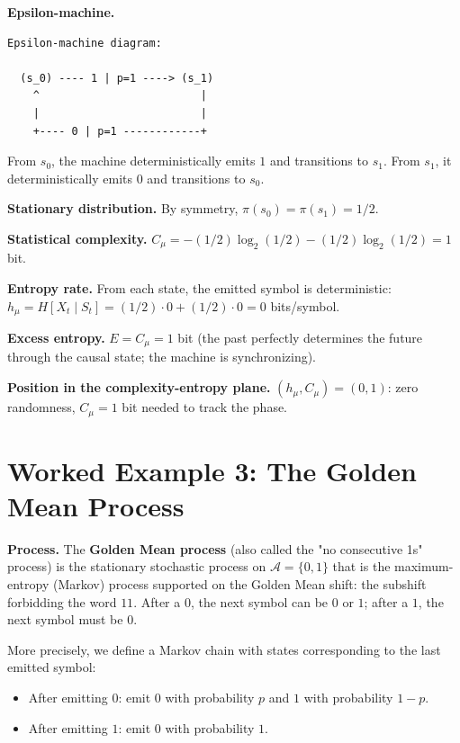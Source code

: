\textbf{Epsilon-machine.}

\begin{verbatim}
Epsilon-machine diagram:

  (s_0) ---- 1 | p=1 ----> (s_1)
    ^                         |
    |                         |
    +---- 0 | p=1 ------------+
\end{verbatim}

From $s_0$, the machine deterministically emits $1$ and transitions to $s_1$. From $s_1$, it deterministically emits $0$ and transitions to $s_0$.

\textbf{Stationary distribution.} By symmetry, $\pi(s_0) = \pi(s_1) = 1/2$.

\textbf{Statistical complexity.} $C_\mu = -(1/2)\log_2(1/2) - (1/2)\log_2(1/2) = 1$ bit.

\textbf{Entropy rate.} From each state, the emitted symbol is deterministic: $h_\mu = H[X_t \mid S_t] = (1/2)\cdot 0 + (1/2) \cdot 0 = 0$ bits/symbol.

\textbf{Excess entropy.} $E = C_\mu = 1$ bit (the past perfectly determines the future through the causal state; the machine is synchronizing).

\textbf{Position in the complexity-entropy plane.} $(h_\mu, C_\mu) = (0, 1)$: zero randomness, $C_\mu = 1$ bit needed to track the phase.



\section{Worked Example 3: The Golden Mean Process}

\textbf{Process.} The \textbf{Golden Mean process} (also called the "no consecutive 1s" process) is the stationary stochastic process on $\mathcal{A} = \{ 0, 1\} $ that is the maximum-entropy (Markov) process supported on the Golden Mean shift: the subshift forbidding the word $11$. After a $0$, the next symbol can be $0$ or $1$; after a $1$, the next symbol must be $0$.

More precisely, we define a Markov chain with states corresponding to the last emitted symbol:

\begin{itemize}
\item After emitting $0$: emit $0$ with probability $p$ and $1$ with probability $1-p$.
\item After emitting $1$: emit $0$ with probability $1$.
\end{itemize}


